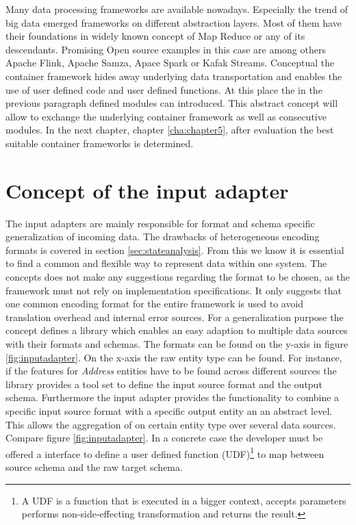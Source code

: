 Many data processing frameworks are available nowadays. Especially the trend of big data emerged frameworks on different abstraction layers. Most of them have their foundations in widely known concept of Map Reduce\cite{dean_ghemawat_2008} or any of its descendants. Promising Open source examples in this case are among others Apache Flink\cite{flink_2017}, Apache Samza\cite{samza_2017}, Apace Spark\cite{spark_2017} or Kafak Streams\cite{kafka_2017}. Conceptual the container framework hides away underlying data transportation and enables the use of user defined code and user defined functions. At this place the in the previous paragraph defined modules can introduced. This abstract concept will allow to exchange the underlying container framework as well as consecutive modules. In the next chapter, chapter \ref{cha:chapter5}, after evaluation the best suitable container frameworks is determined.

\section{Concept of the input adapter \label{sec:inputadapter}}

The input adapters are mainly responsible for format and schema specific generalization of incoming data. The drawbacks of heterogeneous encoding formats is covered in section \ref{sec:stateanalysis}. From this we know it is essential to find a common and flexible way to represent data within one system. The concepts does not make any suggestions regarding the format to be chosen, as the framework must not rely on implementation specifications. It only suggests that one common encoding format for the entire framework is used to avoid translation overhead and internal error sources. For a generalization purpose the concept defines a library which enables an easy adaption to multiple data sources with their formats and schemas. The formats can be found on the y-axis in figure \ref{fig:inputadapter}. On the x-axis the raw entity type can be found. For instance, if the features for \textit{Address} entities have to be found across different sources the library provides a tool set to define the input source format and the output schema. Furthermore the input adapter provides the functionality to combine a specific input source format with a specific output entity an an abstract level. This allows the aggregation of on certain entity type over several data sources. Compare figure \ref{fig:inputadapter}. In a concrete case the developer must be offered a interface to define a user defined function (UDF)\footnote{A UDF is a function that is executed in a bigger context, accepts parameters performs non-side-effecting transformation and returns the result.} to map between source schema and the raw target schema. 

